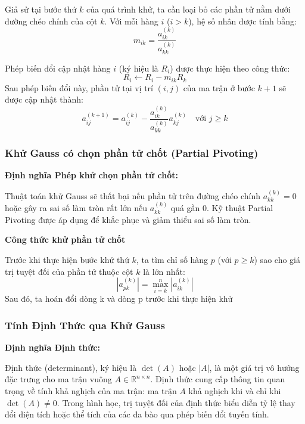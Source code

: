 \documentclass[a4paper]{article}
\begin{document}
Giả sử tại bước thứ $k$ của quá trình khử, ta cần loại bỏ các phần tử nằm dưới đường chéo chính của cột $k$. Với mỗi hàng $i$ ($i > k$), hệ số nhân được tính bằng:
\begin{equation}
m_{ik} = \frac{a_{ik}^{(k)}}{a_{kk}^{(k)}}
\end{equation}

Phép biến đổi cập nhật hàng $i$ (ký hiệu là $R_i$) được thực hiện theo công thức:$$R_i \leftarrow R_i - m_{ik}R_k$$Sau phép biến đổi này, phần tử tại vị trí $(i, j)$ của ma trận ở bước $k+1$ sẽ được cập nhật thành:
\begin{equation}
a_{ij}^{(k+1)} = a_{ij}^{(k)} - \frac{a_{ik}^{(k)}}{a_{kk}^{(k)}} a_{kj}^{(k)} \quad \text{với } j \ge k
\end{equation}

\subsubsection{Khử Gauss có chọn phần tử chốt (Partial Pivoting)}
\textbf{Định nghĩa Phép khử chọn phần tử chốt:}

Thuật toán khử Gauss sẽ thất bại nếu phần tử trên đường chéo chính $a_{kk}^{(k)} = 0$ hoặc gây ra sai số làm tròn rất lớn nếu $a_{kk}^{(k)}$ quá gần 0. Kỹ thuật Partial Pivoting được áp dụng để khắc phục và giảm thiểu sai số làm tròn.

\textbf{Công thức khử phần tử chốt}

Trước khi thực hiện bước khử thứ $k$, ta tìm chỉ số hàng $p$ (với $p \ge k$) sao cho giá trị tuyệt đối của phần tử thuộc cột $k$ là lớn nhất:
\begin{equation}
|a_{pk}^{(k)}| = \max_{i=k}^n |a_{ik}^{(k)}|
\end{equation}
Sau đó, ta hoán đổi dòng k và dòng p trước khi thực hiện khử

\subsubsection{Tính Định Thức qua Khử Gauss}

\textbf{Định nghĩa Định thức:}

Định thức (determinant), ký hiệu là $\det(A)$ hoặc $|A|$, là một giá trị vô hướng đặc trưng cho ma trận vuông $A \in \mathbb{R}^{n \times n}$. Định thức cung cấp thông tin quan trọng về tính khả nghịch của ma trận: ma trận $A$ khả nghịch khi và chỉ khi $\det(A) \neq 0$. Trong hình học, trị tuyệt đối của định thức biểu diễn tỷ lệ thay đổi diện tích hoặc thể tích của các đa bào qua phép biến đổi tuyến tính.
\end{document}
